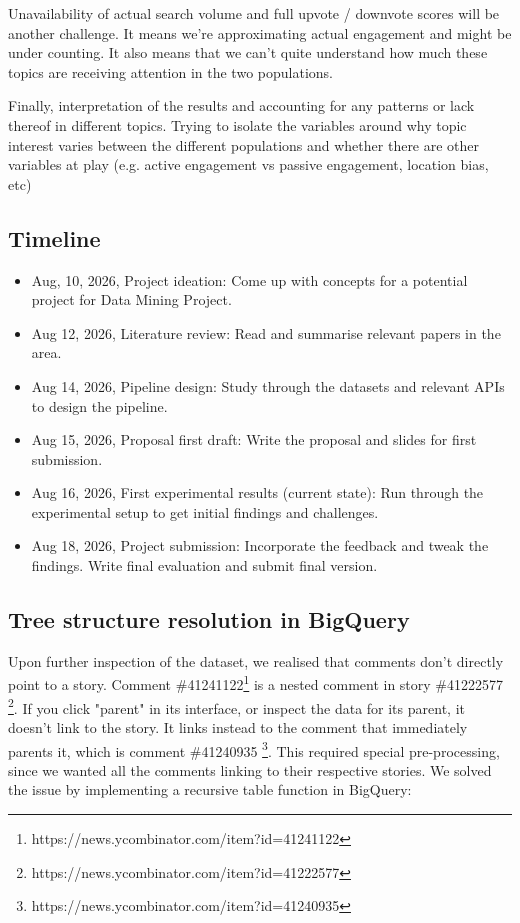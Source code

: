 \documentclass[nonacm,sigconf]{acmart}
\begin{document}
Unavailability of actual search volume and full upvote / downvote scores will be another challenge. It means we're approximating actual engagement and might be under counting. It also means that we can't quite understand how much these topics are receiving attention in the two populations.

Finally, interpretation of the results and accounting for any patterns or lack thereof in different topics. Trying to isolate the variables around why topic interest varies between the different populations and whether there are other variables at play (e.g. active engagement vs passive engagement, location bias, etc)

\subsection{Timeline}

\begin{itemize}
    \item Aug, 10, 2026, Project ideation: Come up with concepts for a potential project for Data Mining Project.
    \item Aug 12, 2026, Literature review: Read and summarise relevant papers in the area.
    \item Aug 14, 2026, Pipeline design: Study through the datasets and relevant APIs to design the pipeline.
    \item Aug 15, 2026, Proposal first draft: Write the proposal and slides for first submission.
    \item Aug 16, 2026, First experimental results (current state): Run through the experimental setup to get initial findings and challenges.
    \item Aug 18, 2026, Project submission: Incorporate the feedback and tweak the findings. Write final evaluation and submit final version.
\end{itemize}

\subsection{Tree structure resolution in BigQuery}

Upon further inspection of the dataset, we realised that comments don't directly point to a story. Comment \#41241122\footnote{https://news.ycombinator.com/item?id=41241122} is a nested comment in story \#41222577 \footnote{https://news.ycombinator.com/item?id=41222577}. If you click "parent" in its interface, or inspect the data for its parent, it doesn't link to the story. It links instead to the comment that immediately parents it, which is comment \#41240935 \footnote{https://news.ycombinator.com/item?id=41240935}. This required special pre-processing, since we wanted all the comments linking to their respective stories. We solved the issue by implementing a recursive table function in BigQuery:
\end{document}
